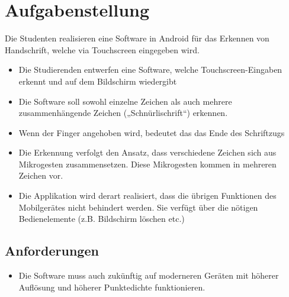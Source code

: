 \chapter{Aufgabenstellung}
Die Studenten realisieren eine Software in Android für das Erkennen von Handschrift, welche via Touchscreen eingegeben wird.

\begin{itemize}
\item Die Studierenden entwerfen eine Software, welche Touchscreen-Eingaben erkennt und auf dem Bildschirm wiedergibt
\item Die Software soll sowohl einzelne Zeichen als auch mehrere zusammenhängende Zeichen („Schnürlischrift“) erkennen.
\item Wenn der Finger angehoben wird, bedeutet das das Ende des Schriftzugs
\item Die Erkennung verfolgt den Ansatz, dass verschiedene Zeichen sich aus Mikrogesten zusammensetzen. Diese Mikrogesten kommen in mehreren Zeichen vor.
\item Die Applikation wird derart realisiert, dass die übrigen Funktionen des Mobilgerätes nicht behindert werden. Sie verfügt über die nötigen Bedienelemente (z.B. Bildschirm löschen etc.)
\end{itemize}

\section{Anforderungen}
\begin{itemize}
\item Die Software muss auch zukünftig auf moderneren Geräten mit höherer Auflösung und höherer Punktedichte funktionieren.
\end{itemize}